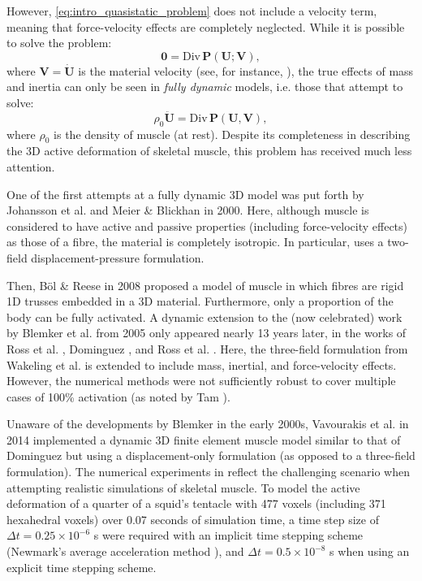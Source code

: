 \documentclass{sfuthesis}
\numberwithin{equation}{section}
\numberwithin{figure}{chapter}
\numberwithin{table}{chapter}
\theoremstyle{definition}
\def\*#1{{\mathbf{#1}}} %
\newcommand{\Divt}[1]{{\bm{\mathrm{Div}} \, #1}}
\begin{document}
However, \eqref{eq:intro_quasistatic_problem} does not include a velocity term, meaning that force-velocity effects are completely neglected. While it is possible to solve the problem:
\begin{equation}
    \*0 = \Divt{\*P(\*U; \*V)},
\end{equation}
where $\*V = \dot{\*U}$ is the material velocity (see, for instance, \cite{DiSalvoBlemker2024,HeidlaufRohrle2013,HeidlaufRohrle2014,MarcucciEtAl2017,Tang2009}), the true effects of mass and inertia can only be seen in \textit{fully dynamic} models, i.e. those that attempt to solve:
\begin{equation}
    \rho_0 \ddot{\*U} = \Divt{\*P(\*U, \*V)},
\end{equation}
where $\rho_0$ is the density of muscle (at rest). Despite its completeness in describing the 3D active deformation of skeletal muscle, this problem has received much less attention.

One of the first attempts at a fully dynamic 3D model was put forth by Johansson et al. \cite{Johansson2000} and Meier \& Blickhan \cite{MeierBlickhan2000} in 2000. Here, although muscle is considered to have active and passive properties (including force-velocity effects) as those of a fibre, the material is completely isotropic. In particular, \cite{Johansson2000} uses a two-field displacement-pressure formulation.


Then, B\"{o}l \& Reese \cite{BolReese2008} in 2008 proposed a model of muscle in which fibres are rigid 1D trusses embedded in a 3D material.
Furthermore, only a proportion of the body can be fully activated. A dynamic extension to the (now celebrated) work by Blemker et al. \cite{BlemkerPinskyDelp2005} from 2005 only appeared nearly 13 years later, in the works of Ross et al. \cite{Ross2018}, Dominguez \cite{Seba}, and Ross et al. \cite{Paper3_RossEtAl2021}. Here, the three-field formulation from Wakeling et al. \cite{Paper1_WakelingEtAl2020} is extended to include mass, inertial, and force-velocity effects. However, the numerical methods were not sufficiently robust to cover multiple cases of 100\% activation (as noted by Tam \cite{Cassidy}). 

Unaware of the developments by Blemker in the early 2000s, Vavourakis et al. \cite{Vavourakis2014} in 2014 implemented a dynamic 3D finite element muscle model similar to that of Dominguez \cite{Seba} but using a displacement-only formulation (as opposed to a three-field formulation). The numerical experiments in \cite{Vavourakis2014} reflect the challenging scenario when attempting realistic simulations of skeletal muscle. To model the active deformation of a quarter of a squid's tentacle with 477 voxels (including 371 hexahedral voxels) over 0.07 seconds of simulation time, a time step size of $\Delta t = 0.25 \times 10^{-6}$ s were required with an implicit time stepping scheme (Newmark's average acceleration method \cite{HughesBook}), and $\Delta t = 0.5 \times 10^{-8}$ s when using an explicit time stepping scheme.
\end{document}
